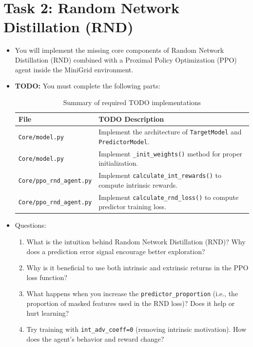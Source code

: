 \documentclass[12pt]{article}
\begin{document}
{{{\section{Task 2: Random Network Distillation (RND)}
\begin{itemize}[noitemsep]
    \item You will implement the missing core components of Random Network Distillation (RND) combined with
a Proximal Policy Optimization (PPO) agent inside the MiniGrid environment.
    \item \textbf{TODO:} You must complete the following parts:
    \begin{table}[h]
    \centering
    \renewcommand{\arraystretch}{1.3}
    \begin{tabular}{ll}
    \toprule
    \textbf{File} & \textbf{TODO Description} \\
    \midrule
    \texttt{Core/model.py} & Implement the architecture of \texttt{TargetModel} and \texttt{PredictorModel}. \\
    \texttt{Core/model.py} & Implement \texttt{\_init\_weights()} method for proper initialization. \\
    \texttt{Core/ppo\_rnd\_agent.py} & Implement \texttt{calculate\_int\_rewards()} to compute intrinsic rewards. \\
    \texttt{Core/ppo\_rnd\_agent.py} & Implement \texttt{calculate\_rnd\_loss()} to compute predictor training loss. \\
    \bottomrule
    \end{tabular}
    \caption{Summary of required TODO implementations}
    \end{table}
    
    \item Questions:
    \begin{enumerate}
    \item What is the intuition behind Random Network Distillation (RND)? Why does a prediction error signal encourage better exploration? 
    
    \item Why is it beneficial to use both intrinsic and extrinsic returns in the PPO loss function?
    
    \item What happens when you increase the \texttt{predictor\_proportion} (i.e., the proportion of masked features used in the RND loss)? Does it help or hurt learning?
    
    \item Try training with \texttt{int\_adv\_coeff=0} (removing intrinsic motivation). How does the agent's behavior and reward change?
    

\end{enumerate}
\end{itemize}}}}
\end{document}
